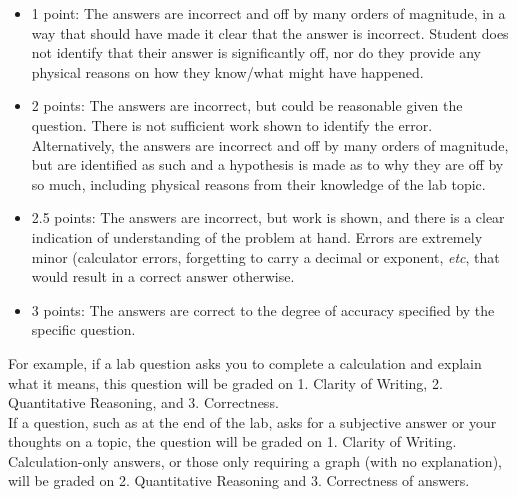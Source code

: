 \documentclass[10pt]{article}
\begin{document}
\begin{enumerate}
\begin{itemize}
	\item 1 point: The answers are incorrect and off by many orders of magnitude, in a way that should have made it clear that the answer is incorrect. Student does not identify that their answer is significantly off, nor do they provide any physical reasons on how they know/what might have happened.
	\item 2 points: The answers are incorrect, but could be reasonable given the question. There is not sufficient work shown to identify the error. Alternatively, the answers are incorrect and off by many orders of magnitude, but are identified as such and a hypothesis is made as to why they are off by so much, including physical reasons from their knowledge of the lab topic.
    \item 2.5 points: The answers are incorrect, but work is shown, and there is a clear indication of understanding of the problem at hand.  Errors are extremely minor (calculator errors, forgetting to carry a decimal or exponent, \textit{etc}, that would result in a correct answer otherwise. 
	\item 3 points: The answers are correct to the degree of accuracy specified by the specific question.
\end{itemize}
\end{enumerate}

For example, if a lab question asks you to complete a calculation and explain what it means, this question will be graded on 1. Clarity of Writing, 2. Quantitative Reasoning, and 3. Correctness. \\

If a question, such as at the end of the lab, asks for a subjective answer or your thoughts on a topic, the question will be graded on 1. Clarity of Writing. \\

Calculation-only answers, or those only requiring a graph (with no explanation), will be graded on 2. Quantitative Reasoning and 3. Correctness of answers. 
\end{document}
